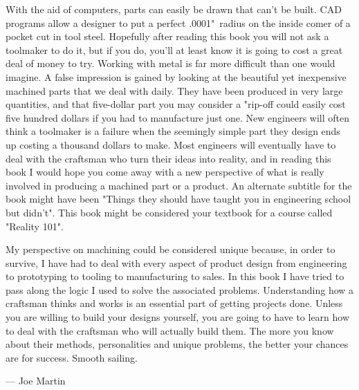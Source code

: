With the aid of computers, parts can easily be drawn that can't be built. CAD
programs allow a designer to put a perfect .0001"\ radius on the inside comer of
a pocket cut in tool steel. Hopefully after reading this book you will not ask a
toolmaker to do it, but if you do, you'll at least know it is going to cost a
great deal of money to try. Working with metal is far more difficult than one
would imagine. A false impression is gained by looking at the beautiful yet
inexpensive machined parts that we deal with daily. They have been produced in
very large quantities, and that five-dollar part you may consider a "rip-off
could easily cost five hundred dollars if you had to manufacture just one. New
engineers will often think a toolmaker is a failure when the seemingly simple
part they design ends up costing a thousand dollars to make. Most engineers will
eventually have to deal with the craftsman who turn their ideas into reality,
and in reading this book I would hope you come away with a new perspective of
what is really involved in producing a machined part or a product. An alternate
subtitle for the book might have been "Things they should have taught you in
engineering school but didn't". This book might be considered your textbook for
a course called "Reality 101".


My perspective on machining could be considered unique because, in order to
survive, I have had to deal with every aspect of product design from engineering
to prototyping to tooling to manufacturing to sales. In this book I have tried
to pass along the logic I used to solve the associated problems. Understanding
how a craftsman thinks and works is an essential part of getting projects done.
Unless you are willing to build your designs yourself, you are going to have to
learn how to deal with the craftsman who will actually build them. The more you
know about their methods, personalities and unique problems, the better your
chances are for success. Smooth sailing.

\bigskip
--- Joe Martin

\secup
\secup
